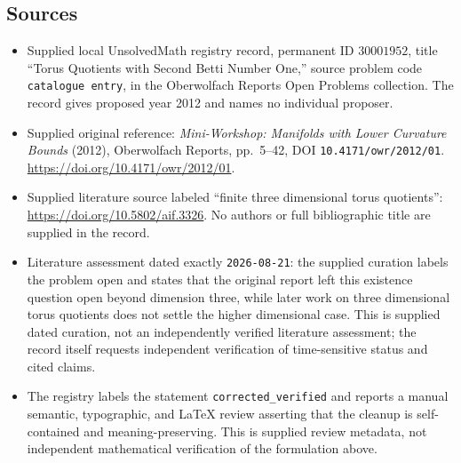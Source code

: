 \documentclass[11pt]{article}
\begin{document}
\subsection{Sources}
\begin{itemize}
\item Supplied local UnsolvedMath registry record, permanent ID \(30001952\), title ``Torus Quotients with Second Betti Number One,'' source problem code \texttt{catalogue entry}, in the Oberwolfach Reports Open Problems collection. The record gives proposed year 2012 and names no individual proposer.
\item Supplied original reference: \emph{Mini-Workshop: Manifolds with Lower Curvature Bounds} (2012), Oberwolfach Reports, pp.\ 5--42, DOI \texttt{10.4171/owr/2012/01}. \url{https://doi.org/10.4171/owr/2012/01}.
\item Supplied literature source labeled ``finite three dimensional torus quotients'': \url{https://doi.org/10.5802/aif.3326}. No authors or full bibliographic title are supplied in the record.
\item Literature assessment dated exactly \texttt{2026-08-21}: the supplied curation labels the problem open and states that the original report left this existence question open beyond dimension three, while later work on three dimensional torus quotients does not settle the higher dimensional case. This is supplied dated curation, not an independently verified literature assessment; the record itself requests independent verification of time-sensitive status and cited claims.
\item The registry labels the statement \texttt{corrected\_verified} and reports a manual semantic, typographic, and LaTeX review asserting that the cleanup is self-contained and meaning-preserving. This is supplied review metadata, not independent mathematical verification of the formulation above.
\end{itemize}
\end{document}
